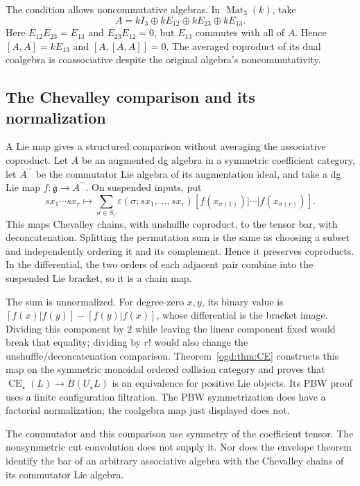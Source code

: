 \begin{example}\label{e1f:ex:noncommutative-average}
The condition allows noncommutative algebras. In
\(\operatorname{Mat}_3(k)\), take
\[
 A=kI_3\oplus kE_{12}\oplus kE_{23}\oplus kE_{13}.
\]
Here \(E_{12}E_{23}=E_{13}\) and
\(E_{23}E_{12}=0\), but \(E_{13}\) commutes with all
of \(A\). Hence \([A,A]=kE_{13}\) and
\([A,[A,A]]=0\). The averaged coproduct of its dual
coalgebra is coassociative despite the original algebra's
noncommutativity.
\end{example}

\subsection{The Chevalley comparison and its normalization}

A\label{e1f:def:chevalley-comparison-input} Lie map gives a structured comparison without averaging
the associative coproduct. Let \(A\) be an augmented dg
algebra in a symmetric coefficient category, let
\(\overline A^-\) be the commutator Lie algebra of its
augmentation ideal, and take a dg Lie map
\(f:\mathfrak g\to\overline A^-\). On suspended inputs,
put
\[
 sx_1\cdots sx_r\longmapsto
 \sum_{\sigma\in S_r}\varepsilon(\sigma;sx_1,\ldots,sx_r)
 [f(x_{\sigma(1)})|\cdots|f(x_{\sigma(r)})].
\]
This maps Chevalley chains, with unshuffle coproduct, to
the tensor bar, with deconcatenation. Splitting the
permutation sum is the same as choosing a subset and
independently ordering it and its complement. Hence it
preserves coproducts. In the differential, the two orders
of each adjacent pair combine into the suspended Lie
bracket, so it is a chain map.

The sum is unnormalized. For degree-zero \(x,y\), its
binary value is \([f(x)|f(y)]-[f(y)|f(x)]\), whose
differential is the bracket image. Dividing this component
by \(2\) while leaving the linear component fixed would
break that equality; dividing by \(r!\) would also change
the unshuffle/deconcatenation comparison.
Theorem~\ref{ogd:thm:CE} constructs this map on the symmetric
monoidal ordered collision category and proves that
\(\operatorname{CE}_\star(L)\to B(U_\star L)\) is an
equivalence for positive Lie objects. Its PBW proof uses
a finite configuration filtration. The PBW symmetrization
does have a factorial normalization; the coalgebra map
just displayed does not.

The commutator and this comparison use symmetry of the
coefficient tensor. The nonsymmetric cut convolution
does not supply it. Nor does the envelope theorem
identify the bar of an arbitrary associative algebra
with the Chevalley chains of its commutator Lie algebra.

